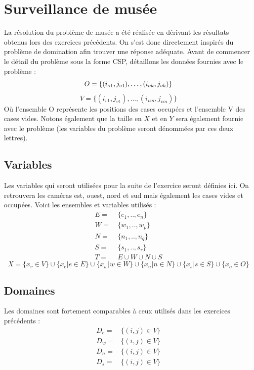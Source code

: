 \documentclass[a4paper]{article}
\begin{document}
\section{Surveillance de musée}
La résolution du problème de musée a été réalisée en dérivant les résultats obtenus lors des exercices précédents. On s'est donc directement inspirés du problème de domination afin trouver une réponse adéquate. Avant de commencer le détail du problème sous la forme CSP, détaillons les données fournies avec le problème : 
\begin{equation*}
O = \{(i_{o1},j_{o1}),\ldots,(i_{ok},j_{ok}) \} \vspace{0.1cm} 
\end{equation*}
\begin{equation*}
V = \{ (i_{v1},j_{v1}),\ldots,(i_{vm},j_{vm}) \}
\end{equation*}
Où l'ensemble O représente les positions des cases occupées et l'ensemble V des cases vides. Notons également que la taille en $X$ et en $Y$ sera également fournie avec le problème (les variables du problème seront dénommées par ces deux lettres).
\subsection{Variables}
Les variables qui seront utilisées pour la suite de l'exercice seront définies ici. On retrouvera les caméras est, ouest, nord et sud mais également les cases vides et occupées. Voici les ensembles et variables utilisés : 
\begin{align*}
E =& \ \{ e_1,.., e_n \} \\
W =& \  \{ w_1,.., w_p \} \\
N =& \  \{ n_1,.., n_q \} \\
S =& \  \{ s_1,.., s_r \} \\
T =& \ E \cup W \cup N \cup S
\end{align*}
\begin{equation*}
X = \{x_v \in V \} \cup \{x_e | e \in E \} \cup \{x_w | w \in W\} \cup \{x_n | n \in N\} \cup \{x_s | s \in S \} \cup \{x_o \in O\} 
\end{equation*}
\subsection{Domaines}
Les domaines sont fortement comparables à ceux utilisés dans les exercices précédents : 
\begin{align*}
D_e =& \{ (i,j) \in V \} \\ 
D_w =& \{ (i,j) \in V \} \\ 
D_n =& \{ (i,j) \in V \} \\ 
D_s =& \{ (i,j) \in V \} \\ 
\end{align*}
\end{document}
